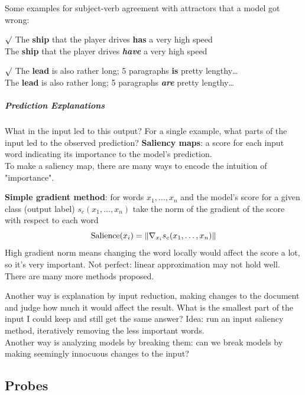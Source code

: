 \documentclass[10pt]{report}
\begin{document}
Some examples for subject-verb agreement with attractors that a model got wrong:
\begin{list}{}{}
	\item[$\surd$] The \textbf{ship} that the player drives \textbf{has} a very high speed\\
	The \textbf{ship} that the player drives \textbf{\textit{have}} a very high speed
	\item[$\surd$] The \textbf{lead} is also rather long; 5 paragraphs \textbf{is} pretty lengthy\ldots\\
	The \textbf{lead} is also rather long; 5 paragraphs \textbf{\textit{are}} pretty lengthy\ldots
\end{list}
\subparagraph{Prediction Explanations} What in the input led to this output? For a single example, what parts of the input led to the observed prediction? \textbf{Saliency maps}: a score for each input word indicating its importance to the model's prediction.\\
To make a saliency map, there are many ways to encode the intuition of "importance".\begin{list}{}{}
	\item \textbf{Simple gradient method}: for words $x_1,\ldots,x_n$ and the model's score for a given class (output label) $s_c(x_1,\ldots,x_n)$ take the norm of the gradient of the score with respect to each word
	$$\hbox{Salience}(x_i)=\|\nabla_{x_i}s_c(x_1,\ldots,x_n)\|$$
	High gradient norm means changing the word locally would affect the score a lot, so it's very important. Not perfect: linear approximation may not hold well. There are many more methods proposed.
\end{list}
Another way is explanation by input reduction, making changes to the document and judge how much it would affect the result. What is the smallest part of the input I could keep and still get the same answer? Idea: run an input saliency method, iteratively removing the less important words.\\
Another way is analyzing models by breaking them: can we break models by making seemingly innocuous changes to the input?
\subsection{Probes}
\end{document}
